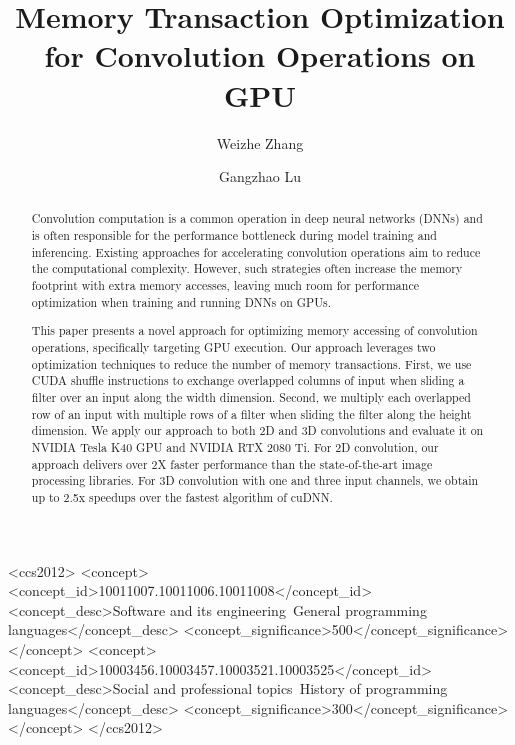 \documentclass[sigplan,review,anonymous]{acmart}\settopmatter{printfolios=true,printccs=false,printacmref=false}
\begin{document}
\title{Memory Transaction Optimization for Convolution Operations on GPU}

\author{Weizhe Zhang}


\author{Gangzhao Lu}


\begin{abstract}
Convolution computation is a common operation in deep neural networks (DNNs) and is often responsible for the performance bottleneck during model training and inferencing. Existing approaches for accelerating convolution operations aim to reduce the computational complexity. However, such strategies often increase the memory footprint with extra memory accesses, leaving much room for performance optimization when training and running DNNs on GPUs. 

This paper presents a novel approach for optimizing memory accessing of convolution operations, specifically targeting GPU execution. Our approach leverages two optimization techniques to reduce the number of memory transactions. First, we use CUDA shuffle instructions to exchange overlapped columns of input when sliding a filter over an input along the width dimension. Second, we multiply each overlapped row of an input with multiple rows of a filter when sliding the filter along the height dimension. We apply our approach to both 2D and 3D convolutions and evaluate it on NVIDIA Tesla K40 GPU and NVIDIA RTX 2080 Ti. For 2D convolution, our approach delivers over 2X faster performance than the state-of-the-art image processing libraries. For 3D convolution with one and three input channels, we obtain up to 2.5x speedups over the fastest algorithm of cuDNN.
\end{abstract}

\begin{CCSXML}
<ccs2012>
<concept>
<concept_id>10011007.10011006.10011008</concept_id>
<concept_desc>Software and its engineering~General programming languages</concept_desc>
<concept_significance>500</concept_significance>
</concept>
<concept>
<concept_id>10003456.10003457.10003521.10003525</concept_id>
<concept_desc>Social and professional topics~History of programming languages</concept_desc>
<concept_significance>300</concept_significance>
</concept>
</ccs2012>
\end{CCSXML}
\end{document}
